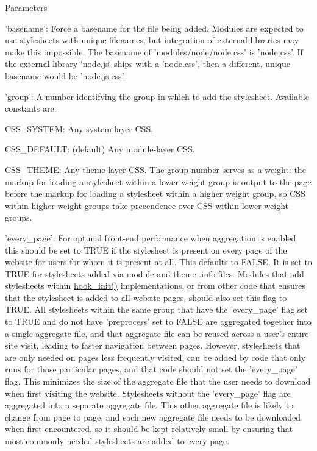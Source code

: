 \begin{DoxyParams}{Parameters}
\begin{DoxyItemize}
\item 'basename': Force a basename for the file being added. Modules are expected to use stylesheets with unique filenames, but integration of external libraries may make this impossible. The basename of 'modules/node/node.css' is 'node.css'. If the external library \char`\"{}node.js\char`\"{} ships with a 'node.css', then a different, unique basename would be 'node.js.css'.
\item 'group': A number identifying the group in which to add the stylesheet. Available constants are:
\begin{DoxyItemize}
\item CSS\_\-SYSTEM: Any system-\/layer CSS.
\item CSS\_\-DEFAULT: (default) Any module-\/layer CSS.
\item CSS\_\-THEME: Any theme-\/layer CSS. The group number serves as a weight: the markup for loading a stylesheet within a lower weight group is output to the page before the markup for loading a stylesheet within a higher weight group, so CSS within higher weight groups take precendence over CSS within lower weight groups.
\end{DoxyItemize}
\item 'every\_\-page': For optimal front-\/end performance when aggregation is enabled, this should be set to TRUE if the stylesheet is present on every page of the website for users for whom it is present at all. This defaults to FALSE. It is set to TRUE for stylesheets added via module and theme .info files. Modules that add stylesheets within \hyperlink{group__hooks_ga74edef0c463436fdbb1f92ef367db051}{hook\_\-init()} implementations, or from other code that ensures that the stylesheet is added to all website pages, should also set this flag to TRUE. All stylesheets within the same group that have the 'every\_\-page' flag set to TRUE and do not have 'preprocess' set to FALSE are aggregated together into a single aggregate file, and that aggregate file can be reused across a user's entire site visit, leading to faster navigation between pages. However, stylesheets that are only needed on pages less frequently visited, can be added by code that only runs for those particular pages, and that code should not set the 'every\_\-page' flag. This minimizes the size of the aggregate file that the user needs to download when first visiting the website. Stylesheets without the 'every\_\-page' flag are aggregated into a separate aggregate file. This other aggregate file is likely to change from page to page, and each new aggregate file needs to be downloaded when first encountered, so it should be kept relatively small by ensuring that most commonly needed stylesheets are added to every page.

\end{DoxyItemize}
\end{DoxyParams}
